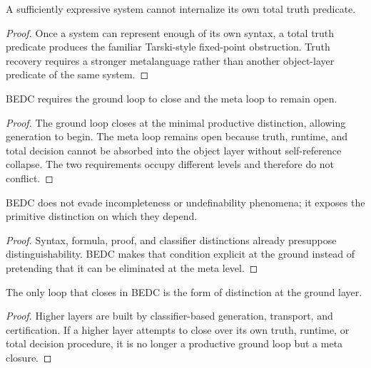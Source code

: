 \begin{theorem}
\label{thm:philosophy-meta-must-stay-open}
A sufficiently expressive system cannot internalize its own total truth
predicate.
\end{theorem}
\begin{proof}
Once a system can represent enough of its own syntax, a total truth
predicate produces the familiar Tarski-style fixed-point obstruction.
Truth recovery requires a stronger metalanguage rather than another
object-layer predicate of the same system.
\end{proof}

\begin{theorem}
\label{thm:philosophy-two-loop-balance}
BEDC requires the ground loop to close and the meta loop to remain
open.
\end{theorem}
\begin{proof}
The ground loop closes at the minimal productive distinction, allowing
generation to begin. The meta loop remains open because truth,
runtime, and total decision cannot be absorbed into the object layer
without self-reference collapse. The two requirements occupy different
levels and therefore do not conflict.
\end{proof}

\begin{corollary}
\label{cor:philosophy-bedc-exposes-boundary}
BEDC does not evade incompleteness or undefinability phenomena; it
exposes the primitive distinction on which they depend.
\end{corollary}
\begin{proof}
Syntax, formula, proof, and classifier distinctions already presuppose
distinguishability. BEDC makes that condition explicit at the ground
instead of pretending that it can be eliminated at the meta level.
\end{proof}

\begin{corollary}
\label{cor:philosophy-only-ground-closes}
The only loop that closes in BEDC is the form of distinction at the
ground layer.
\end{corollary}
\begin{proof}
Higher layers are built by classifier-based generation, transport, and
certification. If a higher layer attempts to close over its own truth,
runtime, or total decision procedure, it is no longer a productive
ground loop but a meta closure.
\end{proof}

